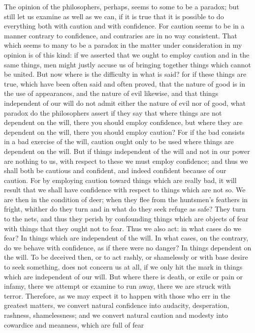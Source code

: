 \documentclass[a4paper]{article}
\begin{document}
    The opinion of the philosophers, perhaps, seems to some to be a paradox;
but still let us examine as well as we can, if it is true that it is possible
to do everything both with caution and with confidence. For caution seems to be
in a manner contrary to confidence, and contraries are in no way consistent.
That which seems to many to be a paradox in the matter under consideration in
my opinion is of this kind: if we asserted that we ought to employ caution and
in the same things, men might justly accuse us of bringing together things
which cannot be united. But now where is the difficulty in what is said? for if
these things are true, which have been often said and often proved, that the
nature of good is in the use of appearances, and the nature of evil likewise,
and that things independent of our will do not admit either the nature of evil
nor of good, what paradox do the philosophers assert if they say that where
things are not dependent on the will, there you should employ confidence, but
where they are dependent on the will, there you should employ caution? For if
the bad consists in a bad exercise of the will, caution ought only to be used
where things are dependent on the will. But if things independent of the will
and not in our power are nothing to us, with respect to these we must employ
confidence; and thus we shall both be cautious and confident, and indeed
confident because of our caution. For by employing caution toward things which
are really bad, it will result that we shall have confidence with respect to
things which are not so.
    We are then in the condition of deer; when they flee from the huntsmen's
feathers in fright, whither do they turn and in what do they seek refuge as
safe? They turn to the nets, and thus they perish by confounding things which
are objects of fear with things that they ought not to fear. Thus we also act:
in what cases do we fear? In things which are independent of the will. In what
cases, on the contrary, do we behave with confidence, as if there were no
danger? In things dependent on the will. To be deceived then, or to act rashly,
or shamelessly or with base desire to seek something, does not concern us at
all, if we only hit the mark in things which are independent of our will. But
where there is death, or exile or pain or infamy, there we attempt or examine
to run away, there we are struck with terror. Therefore, as we may expect it to
happen with those who err in the greatest matters, we convert natural
confidence into audacity, desperation, rashness, shamelessness; and we convert
natural caution and modesty into cowardice and meanness, which are full of fear
\end{document}
